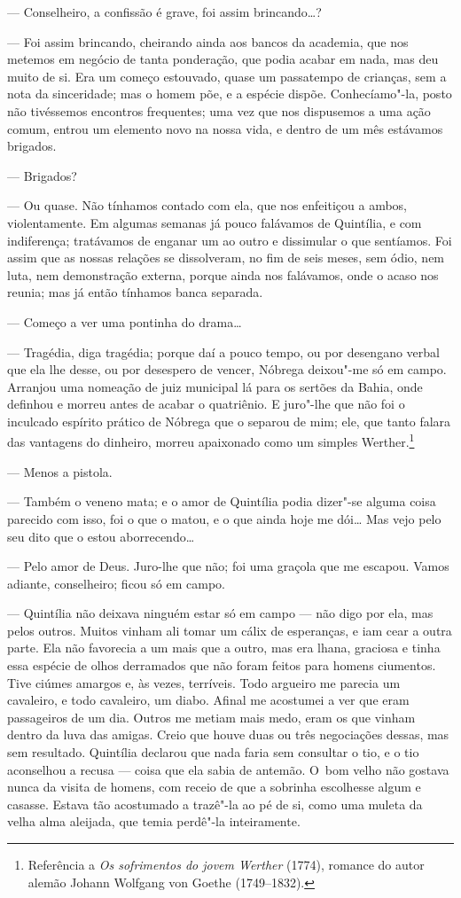 \begin{linenumbers}
--- Conselheiro, a confissão é grave, foi assim brincando\ldots{}?

--- Foi assim brincando, cheirando ainda aos bancos da academia, que nos
metemos em negócio de tanta ponderação, que podia acabar em nada, mas
deu muito de si. Era um começo estouvado, quase um passatempo de
crianças, sem a nota da sinceridade; mas o homem põe, e a espécie
dispõe. Conhecíamo"-la, posto não tivéssemos encontros frequentes; uma
vez que nos dispusemos a uma ação comum, entrou um elemento novo na
nossa vida, e dentro de um mês estávamos brigados.

--- Brigados?

--- Ou quase. Não tínhamos contado com ela, que nos enfeitiçou a ambos,
violentamente. Em algumas semanas já pouco falávamos de Quintília, e com
indiferença; tratávamos de enganar um ao outro e dissimular o que
sentíamos. Foi assim que as nossas relações se dissolveram, no fim de
seis meses, sem ódio, nem luta, nem demonstração externa, porque ainda
nos falávamos, onde o acaso nos reunia; mas já então tínhamos banca
separada.

--- Começo a ver uma pontinha do drama\ldots{}

--- Tragédia, diga tragédia; porque daí a pouco tempo, ou por desengano
verbal que ela lhe desse, ou por desespero de vencer, Nóbrega deixou"-me
só em campo. Arranjou uma nomeação de juiz municipal lá para os sertões
da Bahia, onde definhou e morreu antes de acabar o quatriênio. E
juro"-lhe que não foi o inculcado espírito prático de Nóbrega que o
separou de mim; ele, que tanto falara das vantagens do dinheiro, morreu
apaixonado como um simples Werther.\footnote{Referência a \emph{Os
  sofrimentos do jovem Werther} (1774), romance do autor alemão Johann
  Wolfgang von Goethe (1749--1832).}

--- Menos a pistola.

--- Também o veneno mata; e o amor de Quintília podia dizer"-se alguma
coisa parecido com isso, foi o que o matou, e o que ainda hoje me dói\ldots{}
Mas vejo pelo seu dito que o estou aborrecendo\ldots{}

--- Pelo amor de Deus. Juro-lhe que não; foi uma graçola que me escapou.
Vamos adiante, conselheiro; ficou só em campo.

--- Quintília não deixava ninguém estar só em campo --- não digo por ela,
mas pelos outros. Muitos vinham ali tomar um cálix de esperanças, e iam
cear a outra parte. Ela não favorecia a um mais que a outro, mas era
lhana, graciosa e tinha essa espécie de olhos derramados que não foram
feitos para homens ciumentos. Tive ciúmes amargos e, às vezes,
terríveis. Todo argueiro me parecia um cavaleiro, e todo cavaleiro, um
diabo. Afinal me acostumei a ver que eram passageiros de um dia. Outros
me metiam mais medo, eram os que vinham dentro da luva das amigas. Creio
que houve duas ou três negociações dessas, mas sem resultado. Quintília
declarou que nada faria sem consultar o tio, e o tio aconselhou a recusa
--- coisa que ela sabia de antemão. O~bom velho não gostava nunca da
visita de homens, com receio de que a sobrinha escolhesse algum e
casasse. Estava tão acostumado a trazê"-la ao pé de si, como uma muleta
da velha alma aleijada, que temia perdê"-la inteiramente.


\end{linenumbers}
